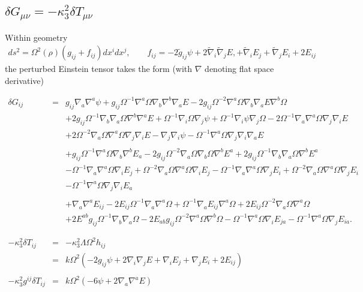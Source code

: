 \documentclass[10pt,letterpaper]{article}
\numberwithin{equation}{section}
\begin{document}
\subsection{$\delta G_{\mu\nu} = -\kappa^2_3 \delta T_{\mu\nu}$}
Within geometry
\begin{eqnarray}
ds^2 = \Omega^2(\rho)(g_{ij} + f_{ij})dx^idx^j,\qquad f_{ij} = -2\tilde g_{ij}\psi + 2\tilde\nabla_i\tilde\nabla_j E,
+\tilde\nabla_i E_j+\tilde\nabla_j E_i + 2E_{ij}
\end{eqnarray}
 the perturbed Einstein tensor takes the form (with $ \nabla$ denoting flat space derivative)

\begin{eqnarray}
\delta G_{ij}&=&g_{ij} \nabla_{a}\nabla^{a}\psi
 + g_{ij} \Omega^{-1} \nabla^{a}\Omega \nabla_{b}\nabla^{b}\nabla_{a}E
 - 2 g_{ij} \Omega^{-2} \nabla^{a}\Omega \nabla_{b}\nabla_{a}E \nabla^{b}\Omega\nonumber\\
&& + 2 g_{ij} \Omega^{-1} \nabla_{b}\nabla_{a}\Omega \nabla^{b}\nabla^{a}E
 + \Omega^{-1} \nabla_{i}\Omega \nabla_{j}\psi
 + \Omega^{-1} \nabla_{i}\psi \nabla_{j}\Omega
 - 2 \Omega^{-1} \nabla_{a}\nabla^{a}\Omega \nabla_{j}\nabla_{i}E\nonumber\\
&& + 2 \Omega^{-2} \nabla_{a}\Omega \nabla^{a}\Omega \nabla_{j}\nabla_{i}E
 -  \nabla_{j}\nabla_{i}\psi
 -  \Omega^{-1} \nabla^{a}\Omega \nabla_{j}\nabla_{i}\nabla_{a}E
\nonumber\\ \nonumber\\
&&+g_{ij} \Omega^{-1} \nabla^{a}\Omega \nabla_{b}\nabla^{b}E_{a}
 - 2 g_{ij} \Omega^{-2} \nabla_{a}\Omega \nabla_{b}\Omega \nabla^{b}E^{a}
 + 2 g_{ij} \Omega^{-1} \nabla_{b}\nabla_{a}\Omega \nabla^{b}E^{a}\nonumber\\
&& -  \Omega^{-1} \nabla_{a}\nabla^{a}\Omega \nabla_{i}E_{j}
 + \Omega^{-2} \nabla_{a}\Omega \nabla^{a}\Omega \nabla_{i}E_{j}
 -  \Omega^{-1} \nabla_{a}\nabla^{a}\Omega \nabla_{j}E_{i}
 + \Omega^{-2} \nabla_{a}\Omega \nabla^{a}\Omega \nabla_{j}E_{i}\nonumber\\
&& -  \Omega^{-1} \nabla^{a}\Omega \nabla_{j}\nabla_{i}E_{a}
\nonumber \\ \nonumber\\
&&+\nabla_{a}\nabla^{a}E_{ij}
 - 2 E_{ij} \Omega^{-1} \nabla_{a}\nabla^{a}\Omega
 + \Omega^{-1} \nabla_{a}E_{ij} \nabla^{a}\Omega
 + 2 E_{ij} \Omega^{-2} \nabla_{a}\Omega \nabla^{a}\Omega\nonumber\\
&& + 2 E^{ab} g_{ij} \Omega^{-1} \nabla_{b}\nabla_{a}\Omega
 - 2 E_{ab} g_{ij} \Omega^{-2} \nabla^{a}\Omega \nabla^{b}\Omega
 -  \Omega^{-1} \nabla^{a}\Omega \nabla_{i}E_{ja}
 -  \Omega^{-1} \nabla^{a}\Omega \nabla_{j}E_{ia}.
\label{dgcfsvt}\\
\nonumber\\ \nonumber\\
-\kappa_3^2 \delta T_{ij} &=& -\kappa^2_3 \Lambda \Omega^2 h_{ij}
\nonumber\\
&=& k \Omega^2 (-2 g_{ij}\psi + 2\nabla_i\nabla_j E + \nabla_i E_j + \nabla_j E_i + 2E_{ij})
\nonumber\\ \nonumber\\
-\kappa_3^2 g^{ij} \delta T_{ij} &=& k\Omega^2(-6\psi + 2\nabla_a\nabla^a E)
\end{eqnarray}
\end{document}
